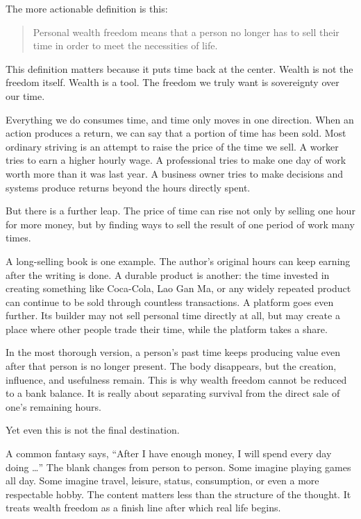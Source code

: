 The more actionable definition is this:

\begin{quote}
Personal wealth freedom means that a person no longer has to sell their time in order to meet the necessities of life.
\end{quote}

This definition matters because it puts time back at the center. Wealth is not the freedom itself. Wealth is a tool. The freedom we truly want is sovereignty over our time.

Everything we do consumes time, and time only moves in one direction. When an action produces a return, we can say that a portion of time has been sold. Most ordinary striving is an attempt to raise the price of the time we sell. A worker tries to earn a higher hourly wage. A professional tries to make one day of work worth more than it was last year. A business owner tries to make decisions and systems produce returns beyond the hours directly spent.

But there is a further leap. The price of time can rise not only by selling one hour for more money, but by finding ways to sell the result of one period of work many times.

A long-selling book is one example. The author's original hours can keep earning after the writing is done. A durable product is another: the time invested in creating something like Coca-Cola, Lao Gan Ma, or any widely repeated product can continue to be sold through countless transactions. A platform goes even further. Its builder may not sell personal time directly at all, but may create a place where other people trade their time, while the platform takes a share.

In the most thorough version, a person's past time keeps producing value even after that person is no longer present. The body disappears, but the creation, influence, and usefulness remain. This is why wealth freedom cannot be reduced to a bank balance. It is really about separating survival from the direct sale of one's remaining hours.

Yet even this is not the final destination.

A common fantasy says, ``After I have enough money, I will spend every day doing \ldots'' The blank changes from person to person. Some imagine playing games all day. Some imagine travel, leisure, status, consumption, or even a more respectable hobby. The content matters less than the structure of the thought. It treats wealth freedom as a finish line after which real life begins.

